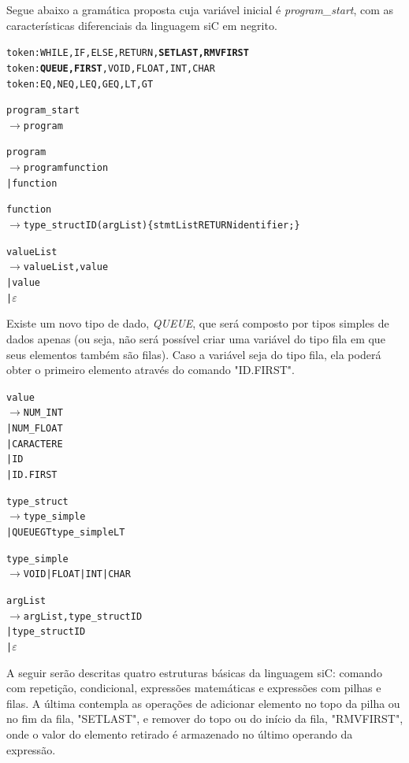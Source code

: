 \documentclass[12pt]{article}
\begin{document}
\indent Segue abaixo a gramática proposta cuja variável inicial é \textit{program\_start}, com as características diferenciais da linguagem siC em negrito.


\begin{alltt}{\footnotesize
token: WHILE, IF, ELSE, RETURN, \textbf{SETLAST, RMVFIRST}
token: \textbf{QUEUE, FIRST}, VOID, FLOAT, INT, CHAR
token: EQ, NEQ, LEQ, GEQ, LT, GT

program_start
   \(\to\) program

program
   \(\to\) program function
   | function

function
   \(\to\) type\_struct ID ( argList ) \{ stmtList RETURN identifier ; \}
    
valueList
	\(\to\) valueList , value
	| value
	| \(\varepsilon\)
	
}\end{alltt}
\indent Existe um novo tipo de dado, \textit{QUEUE}, que será composto por tipos simples de dados apenas (ou seja, não será possível criar uma variável do tipo fila em que seus elementos também são filas). Caso a variável seja do tipo fila, ela poderá obter o primeiro elemento através do comando "ID.FIRST".
\begin{alltt}{\footnotesize    	
	
value
	\(\to\) NUM\_INT
	| NUM\_FLOAT
	| CARACTERE
	| ID
	| ID . FIRST
	
type\_struct
   \(\to\) type\_simple
    | QUEUE GT type\_simple LT
    
type\_simple
   \(\to\) VOID | FLOAT | INT | CHAR  

argList
   \(\to\) argList , type\_struct ID
   | type\_struct ID
   | \(\varepsilon\)

   
}\end{alltt}
\indent A seguir serão descritas quatro estruturas básicas da linguagem siC: comando com repetição, condicional, expressões matemáticas e expressões com pilhas e filas. A última contempla as operações de adicionar elemento no topo da pilha ou no fim da fila, "SETLAST", e remover do topo ou do início da fila, "RMVFIRST", onde o valor do elemento retirado é armazenado no último operando da expressão.
\end{document}
